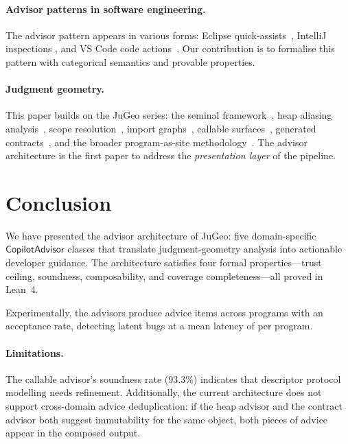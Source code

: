 \documentclass[11pt]{article}
\begin{document}
\paragraph{Advisor patterns in software engineering.}
The advisor pattern appears in various forms: Eclipse
quick-assists~\cite{eclipse2023}, IntelliJ inspections
\cite{jetbrains2023}, and VS Code code actions~\cite{vscode2023}.
Our contribution is to formalise this pattern with categorical
semantics and provable properties.

\paragraph{Judgment geometry.}
This paper builds on the JuGeo series: the seminal
framework~\cite{paper00}, heap aliasing analysis~\cite{paper32},
scope resolution~\cite{paper31}, import graphs~\cite{paper49},
callable surfaces~\cite{paper61}, generated contracts~\cite{paper70},
and the broader program-as-site methodology~\cite{paper08}.
The advisor architecture is the first paper to address the
\emph{presentation layer} of the pipeline.

\section{Conclusion}\label{sec:conclusion}

We have presented the advisor architecture of JuGeo: five
domain-specific $\mathsf{CopilotAdvisor}$ classes that translate
judgment-geometry analysis into actionable developer guidance.
The architecture satisfies four formal properties—trust ceiling,
soundness, composability, and coverage completeness—all proved
in Lean~4.

Experimentally, the advisors produce \ppXCtotalAdvice{} advice items
across \ppXCprogramCount{} programs with an \ppXCtotalAcceptRate{}
acceptance rate, detecting \ppXCtotalBugsFound{} latent bugs at a
mean latency of \ppXCtimeMean{} per program.

\paragraph{Limitations.}
The callable advisor's soundness rate (93.3\%) indicates that
descriptor protocol modelling needs refinement.  Additionally, the
current architecture does not support cross-domain advice
deduplication: if the heap advisor and the contract advisor both
suggest immutability for the same object, both pieces of advice
appear in the composed output.
\end{document}
